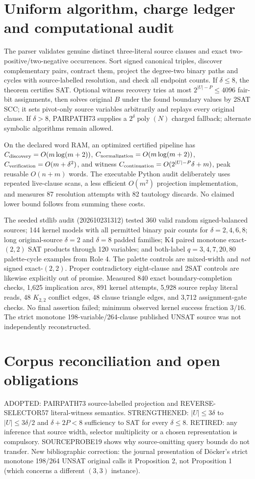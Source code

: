 \documentclass[11pt]{article}
\begin{document}
\section{Uniform algorithm, charge ledger and computational audit}
The parser validates genuine distinct three-literal source clauses and exact two-positive/two-negative occurrences. Sort signed canonical triples, discover complementary pairs, contract them, project the degree-two binary paths and cycles with source-labelled resolution, and check all endpoint counts. If $\delta\le8$, the theorem certifies SAT. Optional witness recovery tries at most $2^{|U|-P}\le4096$ fair-bit assignments, then solves original $B$ under the found boundary values by 2SAT SCC; it sets pivot-only source variables arbitrarily and replays every original clause. If $\delta>8$, PAIRPATH73 supplies a $2^\delta\operatorname{poly}(N)$ charged fallback; alternate symbolic algorithms remain allowed.

On the declared word RAM, an optimized certified pipeline has $C_{\rm discovery}=O(m\log(m+2))$, $C_{\rm normalization}=O(m\log(m+2))$, $C_{\rm verification}=O(m+\delta^2)$, and witness $C_{\rm continuation}=O(2^{|U|-P}\delta+m)$, peak reusable $O(n+m)$ words. The executable Python audit deliberately uses repeated live-clause scans, a less efficient $O(m^2)$ projection implementation, and measures 87 resolution attempts with 82 tautology discards. No claimed lower bound follows from summing these costs.

The seeded stdlib audit (202610231312) tested 360 valid random signed-balanced sources; 144 kernel models with all permitted binary pair counts for $\delta=2,4,6,8$; long original-source $\delta=2$ and $\delta=8$ padded families; K4 paired monotone exact-$(2,2)$ SAT products through 120 variables; and both-label $q=3,4,7,20,80$ palette-cycle examples from Role 4. The palette controls are mixed-width and \emph{not} signed exact-$(2,2)$. Proper contradictory eight-clause and 2SAT controls are likewise explicitly out of promise. Measured 840 exact boundary-completion checks, 1,625 implication arcs, 891 kernel attempts, 5,928 source replay literal reads, 48 $K_{2,2}$ conflict edges, 48 clause triangle edges, and 3,712 assignment-gate checks. No final assertion failed; minimum observed kernel success fraction $3/16$. The strict monotone 198-variable/264-clause published UNSAT source was not independently reconstructed.

\section{Corpus reconciliation and open obligations}
ADOPTED: PAIRPATH73 source-labelled projection and REVERSE-SELECTOR57 literal-witness semantics. STRENGTHENED: $|U|\le3\delta$ to $|U|\le3\delta/2$ and $\delta+2P<8$ sufficiency to SAT for every $\delta\le8$. RETIRED: any inference that source width, selector multiplicity or a chosen representation is compulsory. SOURCEPROBE19 shows why source-omitting query bounds do not transfer. New bibliographic correction: the journal presentation of D\"ocker's strict monotone 198/264 UNSAT original calls it Proposition 2, not Proposition 1 (which concerns a different $(3,3)$ instance).
\end{document}
